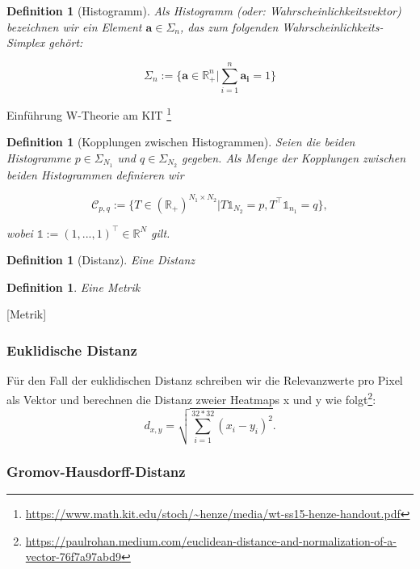 \documentclass[twoside, 11pt,a4paper]{article}
\def\emph#1{\textit{#1}}
\newtheorem{definition}[theorem]{Definition}
\numberwithin{equation}{section}
\begin{document}
	\begin{definition}[Histogramm]
		Als Histogramm (oder: Wahrscheinlichkeitsvektor) bezeichnen wir ein Element $\boldsymbol{a} \in \Sigma_n$, das zum folgenden Wahrscheinlichkeits-Simplex gehört:
		
		\begin{equation*}
		\Sigma_n := \lbrace \boldsymbol{a} \in \mathbb{R}_{+}^n | \sum_{i=1}^n{\boldsymbol{a_i} = 1} \rbrace
		\end{equation*}
	\end{definition}

Einführung W-Theorie am KIT \footnote{\url{https://www.math.kit.edu/stoch/~henze/media/wt-ss15-henze-handout.pdf}}
	\begin{definition}[Kopplungen zwischen Histogrammen]
		Seien die beiden Histogramme $p \in \Sigma_{N_1}$ und $q \in \Sigma_{N_2}$ gegeben.
		Als Menge der Kopplungen zwischen beiden Histogrammen definieren wir
		
		\begin{equation*}
			\mathcal{C}_{p,q} := \lbrace T \in (\mathbb{R}_+)^{N_1 \times N_2} | T \mathbb{1}_{N_2} = p, T^\top \mathbb{1}_{n_1} = q \rbrace,
		\end{equation*}	
		
		wobei $\mathbb{1} := (1,...,1)^\top \in \mathbb{R}^{N}$ gilt.
\end{definition}
	
	
	\begin{definition}[Distanz]
		Eine \emph{Distanz}
	\end{definition}
	\begin{definition}
		Eine \emph{Metrik}
	\end{definition}[Metrik]

	
	
	\subsubsection{Euklidische Distanz} \label{l2dist}
	Für den Fall der euklidischen Distanz schreiben wir die Relevanzwerte pro Pixel als Vektor und berechnen die Distanz zweier Heatmaps x und y wie folgt\footnote{\url{https://paulrohan.medium.com/euclidean-distance-and-normalization-of-a-vector-76f7a97abd9}}:
	$$ d_{x,y} = \sqrt{\sum_{i=1}^{32 * 32}{(x_i -y_i)^2}}.$$
	
	\subsubsection{Gromov-Hausdorff-Distanz}
	
\end{document}
